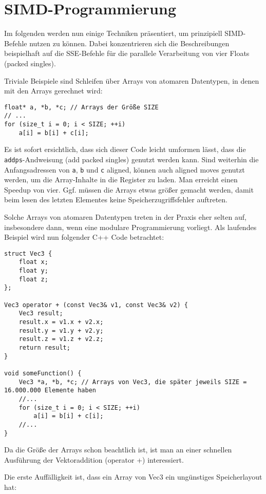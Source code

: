 \documentclass[a4paper,10pt]{article}
\begin{document}
\section{SIMD-Programmierung}

Im folgenden werden nun einige Techniken präsentiert, um prinzipiell SIMD-Befehle nutzen zu können.
Dabei konzentrieren sich die Beschreibungen beispielhaft auf die SSE-Befehle für die parallele
Verarbeitung von vier Floats (packed singles). 

Triviale Beispiele sind Schleifen über Arrays von atomaren Datentypen, in denen mit den Arrays
gerechnet wird:

\begin{verbatim}
float* a, *b, *c; // Arrays der Größe SIZE
// ...
for (size_t i = 0; i < SIZE; ++i)
    a[i] = b[i] + c[i];
\end{verbatim}

Es ist sofort ersichtlich, dass sich dieser Code leicht umformen lässt, dass die
\texttt{addps}-Andweisung (add packed singles) genutzt werden kann. Sind weiterhin die
Anfangsadressen von \texttt{a}, \texttt{b} und \texttt{c} aligned, können auch aligned moves genutzt
werden, um die Array-Inhalte in die Register zu laden. Man erreicht einen Speedup von vier. Ggf.
müssen die Arrays etwas größer gemacht werden, damit beim lesen des letzten Elementes keine
Speicherzugriffsfehler auftreten.

Solche Arrays von atomaren Datentypen treten in der Praxis eher selten auf, insbesondere dann, wenn
eine modulare Programmierung vorliegt. Als laufendes Beispiel wird nun folgender C++ Code
betrachtet:

\begin{verbatim}
struct Vec3 {
    float x;
    float y;
    float z;
};

Vec3 operator + (const Vec3& v1, const Vec3& v2) {
    Vec3 result;
    result.x = v1.x + v2.x;
    result.y = v1.y + v2.y;
    result.z = v1.z + v2.z;
    return result;
}

void someFunction() {
    Vec3 *a, *b, *c; // Arrays von Vec3, die später jeweils SIZE = 16.000.000 Elemente haben
    //...
    for (size_t i = 0; i < SIZE; ++i)
        a[i] = b[i] + c[i];
    //...
}
\end{verbatim}

Da die Größe der Arrays schon beachtlich ist, ist man an einer schnellen Ausführung der
Vektoraddition (operator +) interessiert. 

Die erste Auffälligkeit ist, dass ein Array von Vec3 ein ungünstiges Speicherlayout hat:
\end{document}
